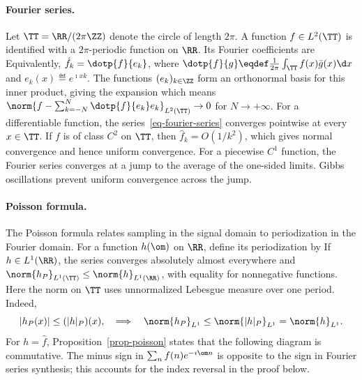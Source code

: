 \paragraph{Fourier series.}

Let $\TT=\RR/(2\pi\ZZ)$ denote the circle of length $2\pi$.
%
A function $f\in L^2(\TT)$ is identified with a $2\pi$-periodic function on $\RR$. Its Fourier coefficients are
Equivalently, $\hat f_k = \dotp{f}{e_k}$, where $\dotp{f}{g} \eqdef \frac{1}{2\pi} \int_\TT f(x) \bar g(x) \d x$ and $e_k(x) \eqdef e^{\imath x k}$.
%
The functions $(e_k)_{k\in\ZZ}$ form an orthonormal basis for this inner product, giving the expansion
which means $\norm{f-\sum_{k=-N}^N \dotp{f}{e_k} e_k}_{L^2(\TT)} \rightarrow 0$ for $N \rightarrow +\infty$.
%
For a differentiable function, the series~\eqref{eq-fourier-series} converges pointwise at every $x \in \TT$. If $f$ is of class $C^2$ on $\TT$, then $\hat f_k = O(1/k^2)$, which gives normal convergence and hence uniform convergence.
%
For a piecewise $C^1$ function, the Fourier series converges at a jump to the average of the one-sided limits. Gibbs oscillations prevent uniform convergence across the jump.


\paragraph{Poisson formula.}

The Poisson formula relates sampling in the signal domain to periodization in the Fourier domain.
%
For a function $h(\om)$ on $\RR$, define its periodization by
If $h \in L^1(\RR)$, the series converges absolutely almost everywhere and $\norm{h_P}_{L^1(\TT)} \leq \norm{h}_{L^1(\RR)}$, with equality for nonnegative functions. Here the norm on $\TT$ uses unnormalized Lebesgue measure over one period. Indeed,
$$
	|h_P(x)| \leq (|h|_P)(x), \quad\Longrightarrow\quad
	\norm{h_P}_{L^1} \leq  \norm{|h|_P}_{L^1} = \norm{h}_{L^1}. 
$$
%
For $h=\hat f$, Proposition~\ref{prop-poisson} states that the following diagram
is commutative. The minus sign in $\sum_n f(n)e^{-\imath\om n}$ is opposite to the sign in Fourier series synthesis; this accounts for the index reversal in the proof below.

